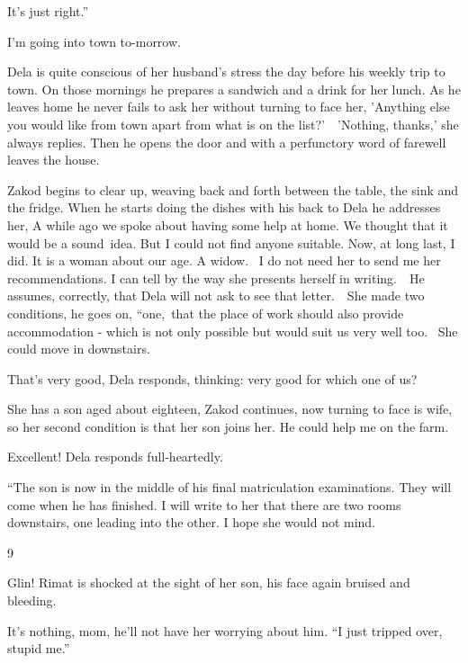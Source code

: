 \documentclass[letterpaper]{article}
\begin{document}
{\textquotedbl}It's just right.'' 

{\textquotedbl}I'm going into town to-morrow.{\textquotedbl}\ 

Dela is quite conscious of her husband's stress the day before his weekly trip to town. On those mornings he prepares a
sandwich and a drink for her lunch. As he leaves home he never fails to ask her without turning to face her, 'Anything
else you would like from town apart from what is on the list?'\ \ {}'Nothing, thanks,' she always replies. Then he
opens the door and with a perfunctory word of farewell leaves the house. 

Zakod begins to clear up, weaving back and forth between the table, the sink and the fridge. When he starts doing the
dishes with his back to Dela he addresses her, {\textquotedbl}A while ago we spoke about having some help at home. We
thought that it would be a sound\ idea. But I could not find anyone suitable. Now, at long last, I did. It is a woman
about our age. A widow.~ I do not need her to send me her recommendations. I can tell by the way she presents herself
in writing.{\textquotedbl}\ \ He assumes, correctly, that Dela will not ask to see that letter.\ \ {\textquotedbl}She
made two conditions,{\textquotedbl} he goes on, ``one,~that the place of work should also provide accommodation - which
is not only possible but would suit us very well too.~ She could move in downstairs.{\textquotedbl} 

{\textquotedbl}That's very good,{\textquotedbl} Dela responds, thinking: very good for which one of us? 

{\textquotedbl}She has a son aged about eighteen,{\textquotedbl} Zakod continues, now turning to face is wife,
{\textquotedbl}so her second condition is that her son joins her. He could help me on the farm.{\textquotedbl} 

{\textquotedbl}Excellent!{\textquotedbl} Dela responds full-heartedly.

{}``The son is now in the middle of his final matriculation examinations. They will come when he has finished. I will
write to her that there are two rooms downstairs, one leading into the other. I hope she would not mind.{\textquotedbl}


\bigskip

9

{\textquotedbl}Glin!{\textquotedbl} Rimat is shocked at the sight of her son, his face again bruised and bleeding.

{\textquotedbl}It's nothing, mom,{\textquotedbl} he'll not have her worrying about him. ``I just tripped over, stupid
me.'' 
\end{document}

